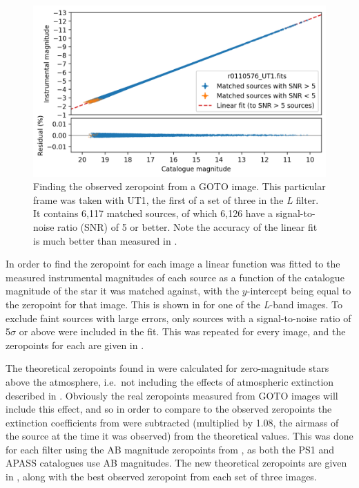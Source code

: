 \begin{colsection}
\begin{figure}[t]
    \begin{center}
        \includegraphics[width=\linewidth]{images/throughput/zeropoint_real_res.png}
    \end{center}
    \caption[Finding the observed zeropoint from a GOTO image]{
        Finding the observed zeropoint from a GOTO image. This particular frame was taken with UT1, the first of a set of three in the \textit{L} filter. It contains 6,117 matched sources, of which 6,126 have a signal-to-noise ratio (SNR) of 5 or better. Note the accuracy of the linear fit is much better than measured in .
    }\label{fig:zeropoint}
\end{figure}

In order to find the zeropoint for each image a linear function was fitted to the measured instrumental magnitudes of each source as a function of the catalogue magnitude of the star it was matched against, with the $y$-intercept being equal to the zeropoint for that image. This is shown in  for one of the \textit{L}-band images. To exclude faint sources with large errors, only sources with a signal-to-noise ratio of 5$\sigma$ or above were included in the fit. This was repeated for every image, and the zeropoints for each are given in .

The theoretical zeropoints found in  were calculated for zero-magnitude stars above the atmosphere, i.e.\ not including the effects of atmospheric extinction described in . Obviously the real zeropoints measured from GOTO images will include this effect, and so in order to compare to the observed zeropoints the extinction coefficients from  were subtracted (multiplied by 1.08, the airmass of the source at the time it was observed) from the theoretical values. This was done for each filter using the AB magnitude zeropoints from , as both the PS1 and APASS catalogues use AB magnitudes. The new theoretical zeropoints are given in , along with the best observed zeropoint from each set of three images.


\end{colsection}
